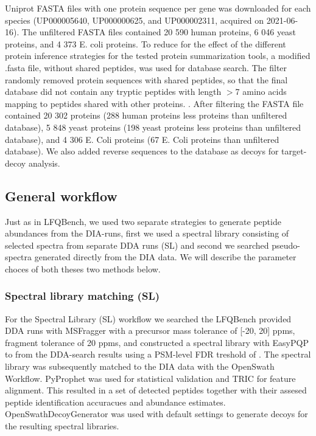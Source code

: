 \documentclass[10pt,letterpaper]{article}
\begin{document}
Uniprot FASTA files with one protein sequence per gene was downloaded for each species (UP000005640, UP000000625, and UP000002311, acquired on 2021-06-16). The unfiltered FASTA files contained 20 590 human proteins, 6 046 yeast proteins, and 4 373 E. coli proteins. To reduce for the effect of the different protein inference strategies for the tested protein summarization tools, a modified .fasta file, without shared peptides, was used for database search. The filter randomly removed protein sequences with shared peptides, so that the final database did not contain any tryptic peptides with length $>$7 amino acids mapping to peptides shared with other proteins. . After filtering the FASTA file contained 20 302 proteins (288 human proteins less proteins than unfiltered database), 5 848 yeast proteins (198 yeast proteins less proteins than unfiltered database), and 4 306 E. Coli proteins (67 E. Coli proteins than unfiltered database).  We also added reverse sequences to the database as decoys for target-decoy analysis. 

\subsection*{General workflow}

Just as in LFQBench, we used two separate strategies to generate peptide abundances from the DIA-runs, first we used a spectral library consisting of selected spectra from separate DDA runs (SL) and second we searched pseudo-spectra generated directly from the DIA data. We will describe the parameter choces of both theses two methods below.

\subsubsection*{Spectral library matching (SL)}

For the Spectral Library (SL) workflow we searched the LFQBench provided DDA runs with MSFragger\cite{kong2017msfragger} with a precursor mass tolerance of [-20, 20] ppms, fragment tolerance of 20 ppms, and constructed a spectral library with EasyPQP \cite{easypqp} to from the DDA-search results using a PSM-level FDR treshold of . The spectral library was subsequently matched to the DIA data with the OpenSwath Workflow. PyProphet\cite{teleman2015diana} was used for statistical validation and TRIC\cite{rost2016tric} for feature alignment. This resulted in a set of detected peptides together with their assesed peptide identification accuracues and abundance estimates.
 OpenSwathDecoyGenerator was used with default settings to generate decoys for the resulting spectral libraries.  
\end{document}

